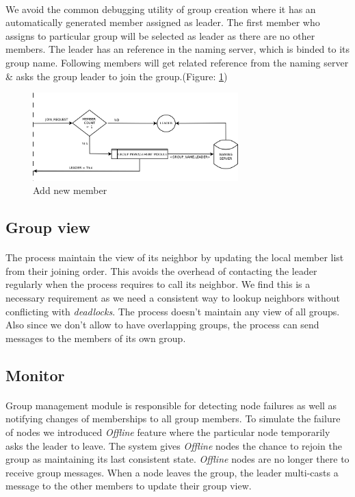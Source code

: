 \documentclass[a4paper,english,twoside]{article}
\begin{document}
\paragraph{}
We avoid the common debugging utility of group creation where it has an automatically generated member assigned as leader. The first member who assigns to particular group will be selected as leader as there are no other members. The leader has an reference in the naming server, which is binded to its group name. Following members will get related reference from the naming server \& asks the group leader to join the group.(Figure: \ref{fig:add_mem})

\begin{figure}[h]
\centering \includegraphics[width=300px]{Add_Member.png}
\caption{Add new member}
\label{fig:add_mem}
\end{figure}

\subsection{Group view}
\paragraph{}
The process maintain the view of its neighbor by updating the local member list from their joining order. This avoids the overhead of contacting the leader regularly when the process requires to call its neighbor. We find this is a necessary requirement as we need a consistent way to lookup neighbors without conflicting with \emph{deadlocks}. The process doesn't maintain any view of all groups. Also since we don't allow to have overlapping groups, the process can send messages to the members of its own group.

\subsection{Monitor}  
\paragraph{}
Group management module is responsible for detecting node failures as well as notifying changes of memberships to all group members. To simulate the failure of nodes we introduced \emph{Offline} feature where the particular node temporarily asks the leader to leave. The system gives \emph{Offline} nodes the chance to rejoin the group as maintaining its last consistent state. \emph{Offline} nodes are no longer there to receive group messages. When a node leaves the group, the leader multi-casts a message to the other members to update their group view.
\end{document}
